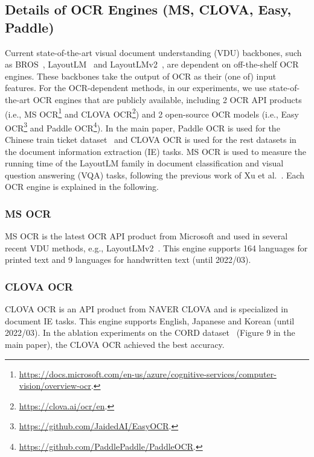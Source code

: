 \documentclass[runningheads]{llncs}
\begin{document}
\subsection{Details of OCR Engines (MS, CLOVA, Easy, Paddle)}\label{sec:detail_of_ocr_engines}
Current state-of-the-art visual document understanding (VDU) backbones, such as BROS~\cite{hong2021bros}, LayoutLM~\cite{xu2019_layoutLM} and LayoutLMv2~\cite{xu-etal-2021-layoutlmv2}, are dependent on off-the-shelf OCR engines.
These backbones take the output of OCR as their (one of) input features.
For the OCR-dependent methods, in our experiments, we use state-of-the-art OCR engines that are publicly available, including 2 OCR API products (i.e., MS OCR\footnote{\url{https://docs.microsoft.com/en-us/azure/cognitive-services/computer-vision/overview-ocr}.\label{footnote_ms_url}} and CLOVA OCR\footnote{\url{https://clova.ai/ocr/en}.\label{footnote_clova_url}}) and 2 open-source OCR models (i.e., Easy OCR\footnote{\url{https://github.com/JaidedAI/EasyOCR}.\label{footnote_easy_url}} and Paddle OCR\footnote{\url{https://github.com/PaddlePaddle/PaddleOCR}.\label{footnote_paddle_url}}).
In the main paper, Paddle OCR is used for the Chinese train ticket dataset~\cite{eaten} and CLOVA OCR is used for the rest datasets in the document information extraction (IE) tasks. 
MS OCR is used to measure the running time of the LayoutLM family in document classification and visual question answering (VQA) tasks, following the previous work of Xu et al.~\cite{xu-etal-2021-layoutlmv2}.
Each OCR engine is explained in the following.

\subsubsection{MS OCR}
MS OCR is the latest OCR API product from Microsoft and used in several recent VDU methods, e.g., LayoutLMv2~\cite{xu-etal-2021-layoutlmv2}.
This engine supports 164 languages for printed text and 9 languages for handwritten text (until 2022/03).

\subsubsection{CLOVA OCR}
CLOVA OCR is an API product from NAVER CLOVA and is specialized in document IE tasks.
This engine supports English, Japanese and Korean (until 2022/03).
In the ablation experiments on the CORD dataset~\cite{park2019cord} (Figure 9 in the main paper), the CLOVA OCR achieved the best accuracy.
\end{document}

